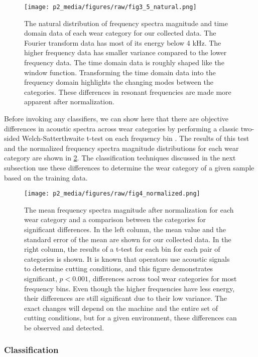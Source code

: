 \begin{figure}[t!]
\centering
\texttt{[image: p2\_media/figures/raw/fig3\_5\_natural.png]}
\caption{
The natural distribution of frequency spectra magnitude 
and time domain data of each wear category for our collected data.
The Fourier transform data has most of its energy below 4 kHz.
The higher frequency data has smaller variance compared to the
lower frequency data.
The time domain data is roughly shaped like the window function.
Transforming the time domain data into the frequency domain highlights
the changing modes between the categories.
These differences in resonant frequencies are made more apparent after normalization.
}
\label{fig:natural}
\end{figure}

Before invoking any classifiers, we can show here that there are 
objective differences in acoustic spectra across wear categories 
by performing a classic two-sided Welch-Satterthwaite t-test on each frequency bin \cite{Tamhane2000}.
The results of this test and the normalized frequency spectra magnitude distributions
for each wear category are shown in \ref{fig:sigs}.
The classification techniques discussed in the next subsection use these differences to 
determine the wear category of a given sample based on the training data.

\begin{figure}[t!]
\centering
\texttt{[image: p2\_media/figures/raw/fig4\_normalized.png]}
\caption{
The mean frequency spectra magnitude after normalization for each wear category and a 
comparison between the categories for significant differences.
In the left column, the mean value and the standard error of the mean are shown for our collected data.
In the right column, the results of a t-test for each bin for each pair of categories is shown.
It is known that operators use acoustic signals to determine cutting conditions,
and this figure demonstrates significant, $p < 0.001$, differences across tool wear categories
for most frequency bins. Even though the higher frequencies have less energy, their differences
are still significant due to their low variance.
The exact changes will depend on the machine and the entire set of cutting conditions, but 
for a given environment, these differences can be observed and detected.
}
\label{fig:sigs}
\end{figure}

\subsubsection{Classification}

